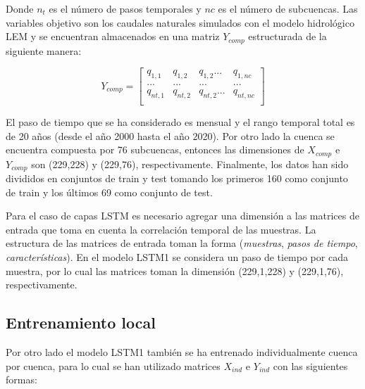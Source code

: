   \vspace{5mm}
  
  
  Donde $n_t$ es el número de pasos temporales y $nc$ es el número de subcuencas. 
  Las variables objetivo son los caudales naturales simulados con el modelo hidrológico LEM y 
  se encuentran almacenados en una matriz $Y_{comp}$ estructurada de la siguiente manera:
  
  \vspace{5mm}
  
  \begin{equation*}
      Y_{comp}= 
      \begin{bmatrix}
          q_{1,1} & q_{1,2} & q_{1,2} ... &  q_{1,nc} \\
          ... & ... & ... &  ... \\
          q_{nt,1} & q_{nt,2} & q_{nt,2} ... &  q_{nt,nc} \\
          \end{bmatrix}
  \end{equation*}
  
  \vspace{5mm}
  
  El paso  de tiempo que se ha considerado es mensual y el rango temporal total es de 20 años 
  (desde el año 2000 hasta el año 2020). Por otro lado la cuenca se encuentra compuesta por 76 subcuencas, 
  entonces las dimensiones de $X_{comp}$ e $Y_{comp}$ son (229,228) y (229,76), respectivamente.
  Finalmente, los datos han sido divididos en conjuntos de train y test tomando los primeros 160 
  como conjunto de train y los últimos 69 como conjunto de test.

  Para el caso de capas LSTM es necesario agregar una dimensión a las matrices de entrada que toma en cuenta la correlación temporal de las muestras. 
  La estructura de las matrices de entrada toman la forma (\textit{muestras}, \textit{pasos de tiempo}, \textit{características}). En el modelo 
  LSTM1 se considera un paso de tiempo por cada muestra, por lo cual  las matrices toman 
  la dimensión (229,1,228) y (229,1,76), respectivamente.

\subsection{Entrenamiento local}
 Por otro lado el modelo LSTM1 también se ha entrenado individualmente cuenca por cuenca, para lo cual se han utilizado
matrices $X_{ind}$ e $Y_{ind}$ con las siguientes formas:
\vspace{5mm}

